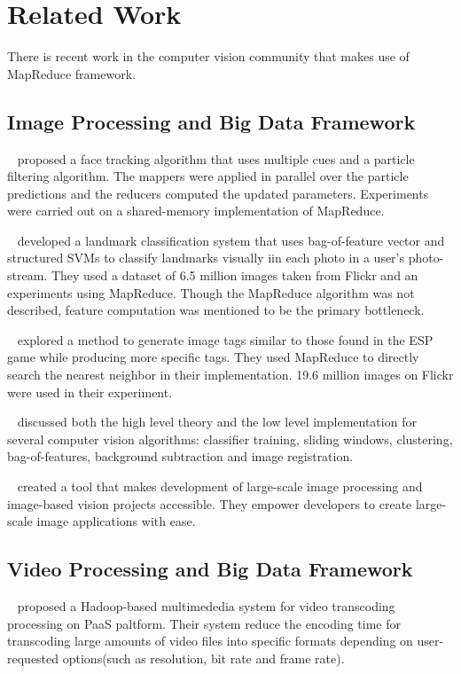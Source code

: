\section{Related Work}
\label{sec:sec_background}



There is recent work in the computer vision community that makes use of
MapReduce framework. 

\subsection{Image Processing and Big Data Framework}
\citeauthor{2009_ICME_Liu}~\cite{2009_ICME_Liu} proposed a face tracking
algorithm that uses multiple cues and a particle filtering algorithm. The mappers were applied in parallel
over the particle predictions and the reducers computed the updated parameters.
Experiments were carried out on a shared-memory implementation of MapReduce. 

\citeauthor{2009_ICCV_Li}~\cite{2009_ICCV_Li} developed a landmark
classification system that uses bag-of-feature vector and structured SVMs to classify landmarks visually iin
each photo in a user's photo-stream. They used a dataset of 6.5 million images
taken from Flickr and an experiments using MapReduce. Though the MapReduce
algorithm was not described, feature computation was mentioned to be the primary
bottleneck. 

\citeauthor{2009_WSMC_Kennedy}~\cite{2009_WSMC_Kennedy} explored a method to
generate image tags similar to those found in the ESP game while producing more specific tags. They used
MapReduce to directly search the nearest neighbor in their implementation. 19.6
million images on Flickr were used in their experiment. 

\citeauthor{2010_KDD_White}~\cite{2010_KDD_White} discussed both the high level
theory and the low level implementation for several computer vision algorithms:
classifier training, sliding windows, clustering, bag-of-features, background
subtraction and image registration. 

\citeauthor{2011_thesis_sweeney}~\cite{2011_thesis_sweeney} created a tool that
makes development of large-scale image processing and image-based vision projects
accessible. They empower developers to create large-scale image applications
with ease.

\subsection{Video Processing and Big Data Framework}
\citeauthor{2012_SMCCSE_Kim}~\cite{2012_SMCCSE_Kim} proposed a Hadoop-based
multimededia system for video transcoding processing on PaaS paltform. Their
system reduce the encoding time for transcoding large amounts of video files
into specific formats depending on user-requested options(such as resolution,
bit rate and frame rate). 

